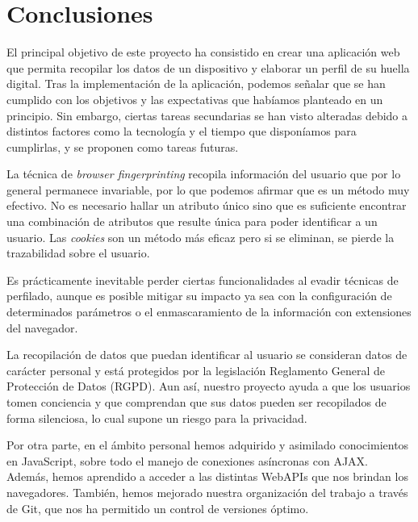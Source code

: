 \chapter{Conclusiones}
\label{ch:conclusiones}
El principal objetivo de este proyecto ha consistido en crear una aplicación web que permita recopilar los datos de un dispositivo y elaborar un perfil de su huella digital. Tras la implementación de la aplicación, podemos señalar que se han cumplido con los objetivos y las expectativas que habíamos planteado en un principio. Sin embargo, ciertas tareas secundarias se han visto alteradas debido a distintos factores como la tecnología y el tiempo que disponíamos para cumplirlas, y se proponen como tareas futuras. \par

La técnica de \textit{browser fingerprinting} recopila información del usuario que por lo general permanece invariable, por lo que podemos afirmar que es un método muy efectivo. No es necesario hallar un atributo único sino que es suficiente encontrar una combinación de atributos que resulte única para poder identificar a un usuario. Las \textit{cookies} son un método más eficaz pero si se eliminan, se pierde la trazabilidad sobre el usuario. \par 

Es prácticamente inevitable perder ciertas funcionalidades al evadir técnicas de perfilado, aunque es posible mitigar su impacto ya sea con la configuración de determinados parámetros o el enmascaramiento de la información con extensiones del navegador. \par 

La recopilación de datos que puedan identificar al usuario se consideran datos de carácter personal y está protegidos por la legislación Reglamento General de Protección de Datos (RGPD). Aun así, nuestro proyecto ayuda a que los usuarios tomen conciencia y que comprendan que sus datos pueden ser recopilados de forma silenciosa, lo cual supone un riesgo para la privacidad. \par

Por otra parte, en el ámbito personal hemos adquirido y asimilado conocimientos en JavaScript, sobre todo el manejo de conexiones asíncronas con AJAX. Además, hemos aprendido a acceder a las distintas WebAPIs que nos brindan los navegadores.
También, hemos mejorado nuestra organización del trabajo a través de Git, que nos ha permitido un control de versiones óptimo. \par

